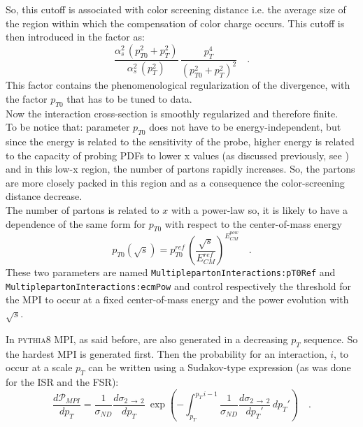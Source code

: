 \noindent So, this cutoff is associated with color screening distance i.e. the average size of the region within which the  compensation of color charge occurs.
This cutoff is then introduced in the factor as:
\begin{equation}
	\frac{\alpha_s^2\,(p_{T0}^2+p_{T}^2)}{\alpha_s^2\,(p_T^2)}\,\frac{p_T^4}{(p_{T0}^2+p_T^2)^2}\quad .
\end{equation}
This factor contains the phenomenological regularization of the divergence, with the factor $p_{T0}$ that has to be tuned to data. 
\\
Now the interaction cross-section is smoothly regularized and therefore finite.
\\
To be notice that: parameter $p_{T0}$ does not have to be energy-independent, but since the energy is related to the sensitivity of the probe, higher energy is related to the capacity of probing PDFs to lower x values (as discussed previously, see ) and in this low-x region, the number of partons rapidly increases. So, the partons are more closely packed in this region and as a consequence the color-screening distance decrease.
\\
The number of partons is related to $x$ with a power-law so, it is likely to have a dependence of the same form for $p_{T0}$ with respect to the center-of-mass energy
\begin{equation}
	p_{T0}(\sqrt{s})=p_{T0}^{ref} \,\left( \frac{\sqrt{s}}{E_{CM}^{ref}} \right)^{E_{CM}^{pow}}\quad .
\end{equation}
These two parameters are named \texttt{MultiplepartonInteractions:}\-\texttt{pT0Ref} and \texttt{Mul}\-\texttt{tiple}\-\texttt{partonInteractions:}\-\texttt{ecmPow} and control respectively the threshold for the MPI to occur at a fixed center-of-mass energy and the power evolution with $\sqrt{s}$. 


In \textsc{pythia}8 MPI, as said before, are also generated in a decreasing $p_T$ sequence. So the hardest MPI is generated first. Then the probability for an interaction, $i$, to occur at a scale $p_T$ can be written using a Sudakov-type expression (as was done for the ISR and the FSR):
\begin{equation}
	\frac{d\mathcal{P}_{MPI}}{dp_T}=\frac{1}{\sigma_{ND}}\frac{d\sigma_{2\,\rightarrow\,2}}{dp_T}\ \exp\left( -\displaystyle\int_{p_T}^{p_T\,i-1} \frac{1}{\sigma_{ND}}\frac{d\sigma_{2\,\rightarrow\,2}}{dp_T'}\,dp_T' \right)\quad .
\end{equation}


